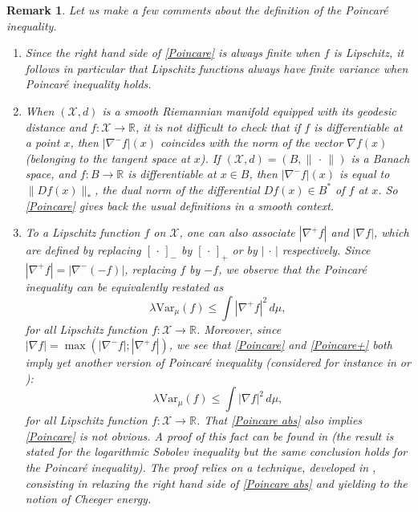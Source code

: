 \documentclass[11pt]{amsart}
\newtheorem{rem}[equation]{Remark}
\numberwithin{equation}{section}
\begin{document}
\begin{rem}\label{rem Poincare}Let us make a few comments about the definition of the Poincar\'e inequality.
\begin{enumerate}
\item Since the right hand side of \eqref{Poincare} is always finite when $f$ is Lipschitz, it follows in particular that Lipschitz functions always have finite variance when Poincar\'e inequality holds.
\item When $({\mathcal{X}},d)$ is a smooth Riemannian manifold equipped with its geodesic distance and $f:{\mathcal{X}}\to{\mathbb{R}}$, it is not difficult to check that if $f$ is differentiable at a point $x$, then $|\nabla^-f|(x)$ coincides with the norm of the \emph{vector} $\nabla f(x)$ (belonging to the tangent space at $x$). 
If $({\mathcal{X}},d)=(B,\|\,\cdot\,\|)$ is a Banach space, and $f:B\to {\mathbb{R}}$ is differentiable at $x\in B$, then $|\nabla^-f|(x)$ is equal to $\|Df(x)\|_*$, the dual norm of the differential $Df(x)\in B^*$ of $f$ at $x$.
So \eqref{Poincare} gives back the usual definitions in a smooth context.
\item To a Lipschitz function $f$ on ${\mathcal{X}}$, one can also associate $|\nabla^+ f|$ and $|\nabla f|$, which are defined by replacing $[\,\cdot\,]_-$ by $[\,\cdot\,]_+$ or by $|\,\cdot\,|$ respectively.
Since $|\nabla^+ f|=|\nabla^-(- f)|$, replacing $f$ by $-f$, we observe that the Poincar\'e inequality can be equivalently restated as 
\begin{equation}\label{Poincare+}
\lambda\mathrm{Var}_\mu (f) \leq \int |\nabla^+ f|^2\,d\mu,
\end{equation}
for all Lipschitz function $f:{\mathcal{X}}\to {\mathbb{R}}$. Moreover, since $|\nabla f|=\max(|\nabla^-f|;|\nabla^+f|)$, we see that \eqref{Poincare} and \eqref{Poincare+} both imply yet another version of Poincar\'e inequality (considered for instance in \cite{Ledoux-book} or \cite{BL97}):
\begin{equation}\label{Poincare abs}
\lambda\mathrm{Var}_\mu (f) \leq \int |\nabla f|^2\,d\mu,
\end{equation}
for all Lipschitz function $f:{\mathcal{X}}\to {\mathbb{R}}$. That \eqref{Poincare abs} also implies \eqref{Poincare} is not obvious. A proof of this fact can be found in \cite[Proposition 5.1]{GL13} (the result is stated for the logarithmic Sobolev inequality but the same conclusion holds for the Poincar\'e inequality). The proof relies on a technique, developed in \cite{AGS12}, consisting in relaxing the right hand side of \eqref{Poincare abs} and yielding to the notion of Cheeger energy.
\end{enumerate}
\end{rem}
\end{document}
